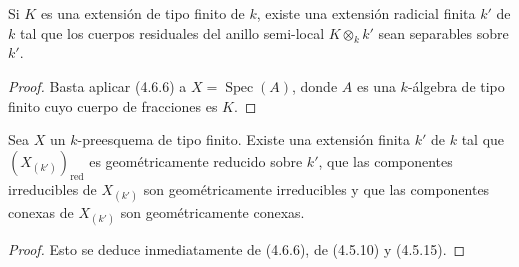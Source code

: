 \begin{corollary}[4.6.7]
\label{IV.2.4.6.7-fr}
Si $K$ es una extensión de tipo finito de $k$, existe una extensión radicial
finita $k'$ de $k$ tal que los cuerpos residuales del anillo semi-local
$K\otimes_k k'$ sean separables sobre $k'$.
\end{corollary}

\begin{proof}
Basta aplicar (4.6.6) a $X=\operatorname{Spec}(A)$, donde $A$ es una
$k$-álgebra de tipo finito cuyo cuerpo de fracciones es $K$.
\end{proof}

\begin{corollary}[4.6.8]
\label{IV.2.4.6.8-fr}
Sea $X$ un $k$-preesquema de tipo finito. Existe una extensión finita $k'$ de
$k$ tal que $(X_{(k')})_{\mathrm{red}}$ es geométricamente reducido sobre $k'$,
que las componentes irreducibles de $X_{(k')}$ son geométricamente irreducibles
y que las componentes conexas de $X_{(k')}$ son geométricamente conexas.
\end{corollary}

\begin{proof}
Esto se deduce inmediatamente de (4.6.6), de (4.5.10) y (4.5.15).
\end{proof}
